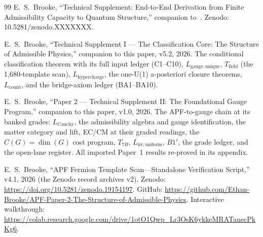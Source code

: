 \documentclass[11pt]{article}
\begin{document}
\begin{thebibliography}{99}
 E.~S.~Brooke, ``Technical Supplement: End-to-End Derivation from Finite Admissibility Capacity to Quantum Structure,'' companion to~\cite{BrookePaper1}.  Zenodo: 10.5281/zenodo.XXXXXXX.

 E.~S.~Brooke, ``Technical Supplement I --- The Classification Core: The Structure of Admissible Physics,'' companion to this paper, v5.2, 2026.  The conditional classification theorem with its full input ledger (C1--C10), $L_{\mathrm{gauge,unique}}$, $T_{\mathrm{field}}$ (the 1{,}680-template scan), $L_{\mathrm{hypercharge}}$, the one-U(1) a-posteriori closure theorems, $L_{\mathrm{count}}$, and the bridge-axiom ledger (BA1--BA10).

 E.~S.~Brooke, ``Paper 2 --- Technical Supplement II: The Foundational Gauge Program,'' companion to this paper, v1.0, 2026.  The APF-to-gauge chain at its banked grades: $L_{\mathrm{Cauchy}}$, the admissibility algebra and gauge identification, the matter category and lift, EC/CM at their graded readings, the $C(G) = \dim(G)$ cost program, $T_{7B}$, $L_{\mathrm{irr,uniform}}$, $B1'$, the grade ledger, and the open-lane register.  All imported Paper~1 results re-proved in its appendix.

 E.~S.~Brooke, ``APF Fermion Template Scan---Standalone Verification Script,'' v4.1, 2026 (the Zenodo record archives v2).  Zenodo: \url{https://doi.org/10.5281/zenodo.19154197}.  GitHub: \url{https://github.com/Ethan-Brooke/APF-Paper-2-The-Structure-of-Admissible-Physics}.  Interactive walkthrough: \url{https://colab.research.google.com/drive/1otO1Qwp_Lr3OsK6ykkeMRATanecPkKg6}.

\end{thebibliography}
\end{document}
